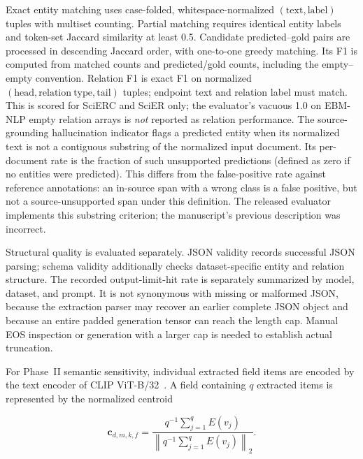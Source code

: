 \documentclass[fleqn,10pt]{wlscirep-authoryear}
\begin{document}
Exact entity matching uses case-folded, whitespace-normalized
\((\mathrm{text},\mathrm{label})\) tuples with multiset counting. Partial matching
requires identical entity labels and token-set Jaccard similarity at least 0.5.
Candidate predicted--gold pairs are processed in descending Jaccard order,
with one-to-one greedy matching. Its F1 is computed from matched counts and
predicted/gold counts, including the empty--empty convention. Relation F1 is
exact F1 on normalized \((\mathrm{head},\mathrm{relation\ type},\mathrm{tail})\)
tuples; endpoint text and relation label must match. This is scored for SciERC
and SciER only; the evaluator's vacuous 1.0 on EBM-NLP empty relation arrays is
\emph{not} reported as relation performance. The source-grounding hallucination
indicator flags a predicted entity when its normalized text is not a contiguous
substring of the normalized input document. Its per-document rate is the fraction
of such unsupported predictions (defined as zero if no entities were predicted).
This differs from the false-positive rate against reference annotations: an
in-source span with a wrong class is a false positive, but not a source-unsupported
span under this definition. The released evaluator implements this substring
criterion; the manuscript's previous description was incorrect.

Structural quality is evaluated separately. JSON validity records successful JSON
parsing; schema validity additionally checks dataset-specific entity and relation
structure. %
The recorded output-limit-hit rate is separately summarized by model, dataset,
and prompt. It is not synonymous with missing or malformed JSON, because the
extraction parser may recover an earlier complete JSON object and because an
entire padded generation tensor can reach the length cap. Manual EOS inspection
or generation with a larger cap is needed to establish actual truncation.

For Phase~II semantic sensitivity, individual extracted field items are encoded by
the text encoder of CLIP ViT-B/32~\cite{radford2021clip}. A field containing
$q$ extracted items is represented by the normalized centroid

\begin{equation}
\mathbf{c}_{d,m,k,f}
=
\frac{
q^{-1}\sum_{j=1}^{q}E(v_j)
}{
\left\|
q^{-1}\sum_{j=1}^{q}E(v_j)
\right\|_2
}.
\end{equation}
\end{document}
